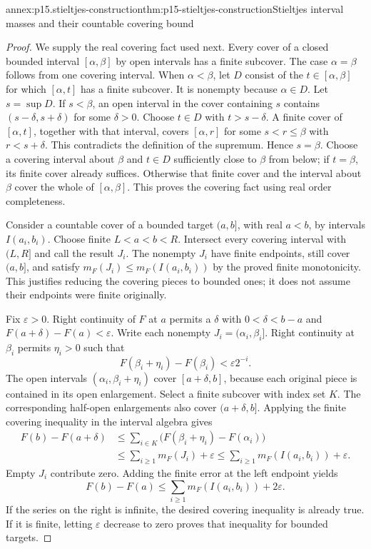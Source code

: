 \begin{annexitem}{annex:p15.stieltjes-construction}{thm:p15-stieltjes-construction}{Stieltjes interval masses and their countable covering bound}
\begin{proof}
We supply the real covering fact used next. Every cover of a closed
bounded interval \([\alpha,\beta]\) by open intervals has a finite
subcover. The case \(\alpha=\beta\) follows from one covering
interval. When \(\alpha<\beta\), let \(D\) consist of the
\(t\in[\alpha,\beta]\) for which \([\alpha,t]\) has a finite
subcover. It is nonempty because \(\alpha\in D\). Let
\(s=\sup D\). If \(s<\beta\), an open interval in the cover
containing \(s\) contains \((s-\delta,s+\delta)\) for some
\(\delta>0\). Choose \(t\in D\) with \(t>s-\delta\).
A finite cover of \([\alpha,t]\), together with that interval,
covers \([\alpha,r]\) for some \(s<r\leq\beta\) with
\(r<s+\delta\). This contradicts the definition of the supremum.
Hence \(s=\beta\). Choose a covering interval about \(\beta\)
and \(t\in D\) sufficiently close to \(\beta\) from below;
if \(t=\beta\), its finite cover already suffices. Otherwise that
finite cover and the interval about \(\beta\) cover the whole of
\([\alpha,\beta]\). This proves the covering fact using real
order completeness.

Consider a countable cover of a bounded target \((a,b]\), with
real \(a<b\), by intervals \(I(a_i,b_i)\). Choose finite
\(L<a<b<R\). Intersect every covering interval with \((L,R]\)
and call the result \(J_i\). The nonempty \(J_i\) have finite
endpoints, still cover \((a,b]\), and satisfy
\(m_F(J_i)\leq m_F(I(a_i,b_i))\) by the proved finite monotonicity.
This justifies reducing the covering pieces to bounded ones; it does
not assume their endpoints were finite originally.

Fix \(\varepsilon>0\). Right continuity of \(F\) at \(a\)
permits a \(\delta\) with \(0<\delta<b-a\) and
\(F(a+\delta)-F(a)<\varepsilon\). Write each nonempty
\(J_i=(\alpha_i,\beta_i]\). Right continuity at \(\beta_i\)
permits \(\eta_i>0\) such that
\[
 F(\beta_i+\eta_i)-F(\beta_i)<\varepsilon2^{-i}.
\]
The open intervals \((\alpha_i,\beta_i+\eta_i)\) cover
\([a+\delta,b]\), because each original piece is contained in its
open enlargement. Select a finite subcover with index set \(K\).
The corresponding half-open enlargements also cover \((a+\delta,b]\).
Applying the finite covering inequality in the interval algebra gives
\[
 \begin{aligned}
 F(b)-F(a+\delta)
  &\leq\sum_{i\in K}\bigl(F(\beta_i+\eta_i)-F(\alpha_i)\bigr)\\
  &\leq\sum_{i\geq1}m_F(J_i)+\varepsilon
   \leq\sum_{i\geq1}m_F(I(a_i,b_i))+\varepsilon.
 \end{aligned}
\]
Empty \(J_i\) contribute zero. Adding the finite error at the left
endpoint yields
\[
 F(b)-F(a)\leq\sum_{i\geq1}m_F(I(a_i,b_i))+2\varepsilon.
\]
If the series on the right is infinite, the desired covering inequality
is already true. If it is finite, letting \(\varepsilon\) decrease
to zero proves that inequality for bounded targets.


\end{proof}
\end{annexitem}
